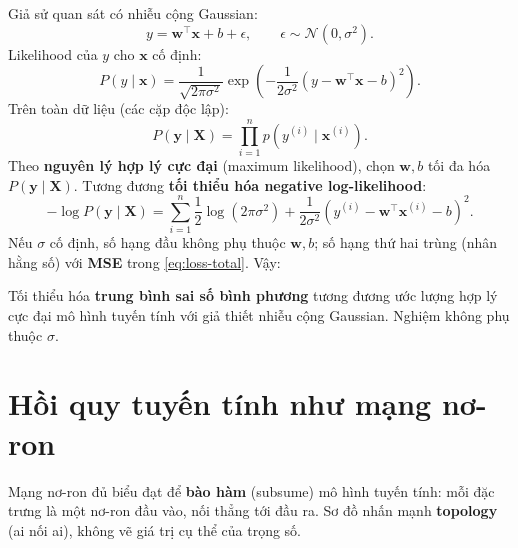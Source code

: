 \documentclass[12pt,a4paper]{article}
\begin{document}
Giả sử quan sát có nhiễu cộng Gaussian:
\begin{equation}\label{eq:noise-model}
  y = \mathbf{w}^\top \mathbf{x} + b + \epsilon,
  \qquad \epsilon \sim \mathcal{N}(0, \sigma^2).
\end{equation}
Likelihood của $y$ cho $\mathbf{x}$ cố định:
\begin{equation}\label{eq:likelihood}
  P(y \mid \mathbf{x})
  = \frac{1}{\sqrt{2\pi\sigma^2}}
  \exp\left(-\frac{1}{2\sigma^2}\left(y - \mathbf{w}^\top \mathbf{x} - b\right)^2\right).
\end{equation}
Trên toàn dữ liệu (các cặp độc lập):
\begin{equation}\label{eq:likelihood-all}
  P(\mathbf{y} \mid \mathbf{X}) = \prod_{i=1}^n p\!\left(y^{(i)} \mid \mathbf{x}^{(i)}\right).
\end{equation}
Theo \textbf{nguyên lý hợp lý cực đại} (maximum likelihood), chọn $\mathbf{w}, b$ tối đa hóa $P(\mathbf{y}\mid\mathbf{X})$. Tương đương \textbf{tối thiểu hóa negative log-likelihood}:
\begin{equation}\label{eq:nll}
  -\log P(\mathbf{y} \mid \mathbf{X})
  = \sum_{i=1}^n \frac{1}{2}\log(2\pi\sigma^2)
  + \frac{1}{2\sigma^2}\left(y^{(i)} - \mathbf{w}^\top \mathbf{x}^{(i)} - b\right)^2.
\end{equation}
Nếu $\sigma$ cố định, số hạng đầu không phụ thuộc $\mathbf{w}, b$; số hạng thứ hai trùng (nhân hằng số) với \textbf{MSE} trong \eqref{eq:loss-total}. Vậy:
\begin{tinhchat}[title={MSE $\Leftrightarrow$ MLE dưới nhiễu Gaussian}]
Tối thiểu hóa \textbf{trung bình sai số bình phương} tương đương ước lượng hợp lý cực đại mô hình tuyến tính với giả thiết nhiễu cộng Gaussian. Nghiệm không phụ thuộc $\sigma$.
\end{tinhchat}

\newpage

\section{Hồi quy tuyến tính như mạng nơ-ron}

\begin{ynghia}[title={Mô hình tuyến tính trong ngôn ngữ mạng nơ-ron}]
Mạng nơ-ron đủ biểu đạt để \textbf{bào hàm} (subsume) mô hình tuyến tính: mỗi đặc trưng là một nơ-ron đầu vào, nối thẳng tới đầu ra. Sơ đồ nhấn mạnh \textbf{topology} (ai nối ai), không vẽ giá trị cụ thể của trọng số.
\end{ynghia}
\end{document}
